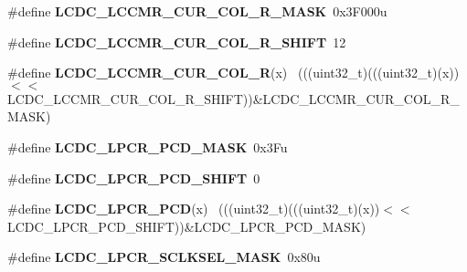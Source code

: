 \begin{DoxyCompactItemize}
\item 
\hypertarget{group___l_c_d_c___register___masks_ga746b49f6ce3c654266632efd728a206d}{}\#define {\bfseries L\+C\+D\+C\+\_\+\+L\+C\+C\+M\+R\+\_\+\+C\+U\+R\+\_\+\+C\+O\+L\+\_\+\+R\+\_\+\+M\+A\+S\+K}~0x3\+F000u\label{group___l_c_d_c___register___masks_ga746b49f6ce3c654266632efd728a206d}

\item 
\hypertarget{group___l_c_d_c___register___masks_gaaf6a733ecf30505cd7d49613db3317bf}{}\#define {\bfseries L\+C\+D\+C\+\_\+\+L\+C\+C\+M\+R\+\_\+\+C\+U\+R\+\_\+\+C\+O\+L\+\_\+\+R\+\_\+\+S\+H\+I\+F\+T}~12\label{group___l_c_d_c___register___masks_gaaf6a733ecf30505cd7d49613db3317bf}

\item 
\hypertarget{group___l_c_d_c___register___masks_ga4854a75e3c4b3d9870839befd4b7c320}{}\#define {\bfseries L\+C\+D\+C\+\_\+\+L\+C\+C\+M\+R\+\_\+\+C\+U\+R\+\_\+\+C\+O\+L\+\_\+\+R}(x)                                ~(((uint32\+\_\+t)(((uint32\+\_\+t)(x))$<$$<$L\+C\+D\+C\+\_\+\+L\+C\+C\+M\+R\+\_\+\+C\+U\+R\+\_\+\+C\+O\+L\+\_\+\+R\+\_\+\+S\+H\+I\+F\+T))\&L\+C\+D\+C\+\_\+\+L\+C\+C\+M\+R\+\_\+\+C\+U\+R\+\_\+\+C\+O\+L\+\_\+\+R\+\_\+\+M\+A\+S\+K)\label{group___l_c_d_c___register___masks_ga4854a75e3c4b3d9870839befd4b7c320}

\item 
\hypertarget{group___l_c_d_c___register___masks_ga133336877a79f5df2b81cd1c81a9d7dd}{}\#define {\bfseries L\+C\+D\+C\+\_\+\+L\+P\+C\+R\+\_\+\+P\+C\+D\+\_\+\+M\+A\+S\+K}~0x3\+Fu\label{group___l_c_d_c___register___masks_ga133336877a79f5df2b81cd1c81a9d7dd}

\item 
\hypertarget{group___l_c_d_c___register___masks_ga7948e144af31fd47fc55755085de7801}{}\#define {\bfseries L\+C\+D\+C\+\_\+\+L\+P\+C\+R\+\_\+\+P\+C\+D\+\_\+\+S\+H\+I\+F\+T}~0\label{group___l_c_d_c___register___masks_ga7948e144af31fd47fc55755085de7801}

\item 
\hypertarget{group___l_c_d_c___register___masks_ga843346de89385153f09f0130922d85a6}{}\#define {\bfseries L\+C\+D\+C\+\_\+\+L\+P\+C\+R\+\_\+\+P\+C\+D}(x)                                              ~(((uint32\+\_\+t)(((uint32\+\_\+t)(x))$<$$<$L\+C\+D\+C\+\_\+\+L\+P\+C\+R\+\_\+\+P\+C\+D\+\_\+\+S\+H\+I\+F\+T))\&L\+C\+D\+C\+\_\+\+L\+P\+C\+R\+\_\+\+P\+C\+D\+\_\+\+M\+A\+S\+K)\label{group___l_c_d_c___register___masks_ga843346de89385153f09f0130922d85a6}

\item 
\hypertarget{group___l_c_d_c___register___masks_ga19a37d96327da26179007cbe24772f35}{}\#define {\bfseries L\+C\+D\+C\+\_\+\+L\+P\+C\+R\+\_\+\+S\+C\+L\+K\+S\+E\+L\+\_\+\+M\+A\+S\+K}~0x80u\label{group___l_c_d_c___register___masks_ga19a37d96327da26179007cbe24772f35}


\end{DoxyCompactItemize}
